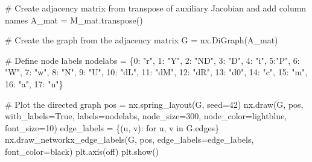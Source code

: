 \documentclass[
  letterpaper,
  DIV=11,
  numbers=noendperiod]{scrreprt}
\newenvironment{Shaded}{\begin{snugshade}}{\end{snugshade}}
\newcommand{\CommentTok}[1]{\textcolor[rgb]{0.37,0.37,0.37}{#1}}
\newcommand{\ControlFlowTok}[1]{\textcolor[rgb]{0.00,0.23,0.31}{#1}}
\newcommand{\DecValTok}[1]{\textcolor[rgb]{0.68,0.00,0.00}{#1}}
\newcommand{\KeywordTok}[1]{\textcolor[rgb]{0.00,0.23,0.31}{#1}}
\newcommand{\NormalTok}[1]{\textcolor[rgb]{0.00,0.23,0.31}{#1}}
\newcommand{\OperatorTok}[1]{\textcolor[rgb]{0.37,0.37,0.37}{#1}}
\newcommand{\StringTok}[1]{\textcolor[rgb]{0.13,0.47,0.30}{#1}}
\newcommand{\VariableTok}[1]{\textcolor[rgb]{0.07,0.07,0.07}{#1}}
\begin{document}
\begin{tcolorbox}
\begin{Shaded}
\begin{Highlighting}[]
    
\CommentTok{\# Create adjacency matrix from transpose of auxiliary Jacobian and add column names}
\NormalTok{A\_mat }\OperatorTok{=}\NormalTok{ M\_mat.transpose()}

\CommentTok{\# Create the graph from the adjacency matrix}
\NormalTok{G }\OperatorTok{=}\NormalTok{ nx.DiGraph(A\_mat)}

\CommentTok{\# Define node labels}
\NormalTok{nodelabs }\OperatorTok{=}\NormalTok{ \{}\DecValTok{0}\NormalTok{: }\StringTok{"r"}\NormalTok{, }\DecValTok{1}\NormalTok{: }\StringTok{"Y"}\NormalTok{, }\DecValTok{2}\NormalTok{: }\StringTok{"ND"}\NormalTok{, }\DecValTok{3}\NormalTok{: }\StringTok{"D"}\NormalTok{, }\DecValTok{4}\NormalTok{: }\StringTok{"i"}\NormalTok{, }\DecValTok{5}\NormalTok{:}\StringTok{"P"}\NormalTok{, }\DecValTok{6}\NormalTok{: }\StringTok{"W"}\NormalTok{, }\DecValTok{7}\NormalTok{: }\StringTok{"w"}\NormalTok{, }
            \DecValTok{8}\NormalTok{: }\StringTok{"N"}\NormalTok{, }\DecValTok{9}\NormalTok{: }\StringTok{"U"}\NormalTok{, }\DecValTok{10}\NormalTok{: }\StringTok{"dL"}\NormalTok{, }\DecValTok{11}\NormalTok{: }\StringTok{"dM"}\NormalTok{, }\DecValTok{12}\NormalTok{: }\StringTok{"dR"}\NormalTok{, }\DecValTok{13}\NormalTok{: }\StringTok{"d0"}\NormalTok{, }\DecValTok{14}\NormalTok{: }\StringTok{"c"}\NormalTok{, }
            \DecValTok{15}\NormalTok{: }\StringTok{"m"}\NormalTok{, }\DecValTok{16}\NormalTok{: }\StringTok{"a"}\NormalTok{, }\DecValTok{17}\NormalTok{: }\StringTok{"n"}\NormalTok{\}}

\CommentTok{\# Plot the directed graph}
\NormalTok{pos }\OperatorTok{=}\NormalTok{ nx.spring\_layout(G, seed}\OperatorTok{=}\DecValTok{42}\NormalTok{)  }
\NormalTok{nx.draw(G, pos, with\_labels}\OperatorTok{=}\VariableTok{True}\NormalTok{, labels}\OperatorTok{=}\NormalTok{nodelabs, node\_size}\OperatorTok{=}\DecValTok{300}\NormalTok{, node\_color}\OperatorTok{=}\StringTok{\textquotesingle{}lightblue\textquotesingle{}}\NormalTok{, }
\NormalTok{        font\_size}\OperatorTok{=}\DecValTok{10}\NormalTok{)}
\NormalTok{edge\_labels }\OperatorTok{=}\NormalTok{ \{(u, v): }\StringTok{\textquotesingle{}\textquotesingle{}} \ControlFlowTok{for}\NormalTok{ u, v }\KeywordTok{in}\NormalTok{ G.edges\}}
\NormalTok{nx.draw\_networkx\_edge\_labels(G, pos, edge\_labels}\OperatorTok{=}\NormalTok{edge\_labels, font\_color}\OperatorTok{=}\StringTok{\textquotesingle{}black\textquotesingle{}}\NormalTok{)}
\NormalTok{plt.axis(}\StringTok{\textquotesingle{}off\textquotesingle{}}\NormalTok{)}
\NormalTok{plt.show()}
\end{Highlighting}
\end{Shaded}

\end{tcolorbox}
\end{document}
